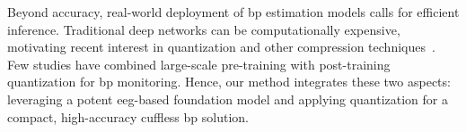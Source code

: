 Beyond accuracy, real-world deployment of \gls{bp} estimation models calls for efficient inference. Traditional deep networks can be computationally expensive, motivating recent interest in quantization and other compression techniques~\cite{nagel2021whitepaperneuralnetwork}. Few studies have combined large-scale pre-training with post-training quantization for \gls{bp} monitoring. Hence, our method integrates these two aspects: leveraging a potent \gls{eeg}-based foundation model and applying quantization for a compact, high-accuracy cuffless \gls{bp} solution.